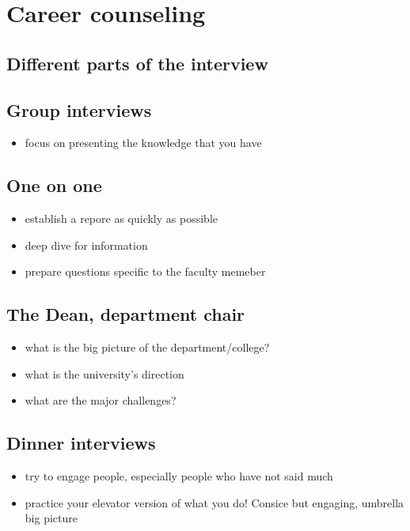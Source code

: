 \documentclass[12pt]{article}
\begin{document}
\section{Career counseling}

\subsection{Different parts of the interview}
\subsection{Group interviews}
\begin{itemize}
\item focus on presenting the knowledge that you have
\end{itemize}

\subsection{One on one}
\begin{itemize}
\item establish a repore as quickly as possible
\item deep dive for information
\item prepare questions specific to the faculty memeber
\end{itemize}

\subsection{The Dean, department chair}
\begin{itemize}
\item what is the big picture of the department/college?
\item what is the university's direction
\item what are the major challenges?
\end{itemize}

\subsection{Dinner interviews}
\begin{itemize}
\item try to engage people, especially people who have not said much
\item practice your elevator version of what you do! Consice but
  engaging, umbrella big picture
\end{itemize}
\end{document}
